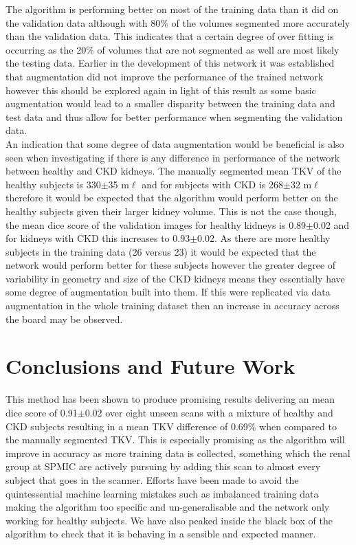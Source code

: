 The algorithm is performing better on most of the training data than it did on the validation data although with 80\% of the volumes segmented more accurately than the validation data. This indicates that a certain degree of over fitting is occurring as the 20\% of volumes that are not segmented as well are most likely the testing data. Earlier in the development of this network it was established that augmentation did not improve the performance of the trained network however this should be explored again in light of this result as some basic augmentation would lead to a smaller disparity between the training data and test data and thus allow for better performance when segmenting the validation data.\\

An indication that some degree of data augmentation would be beneficial is also seen when investigating if there is any difference in performance of the network between healthy and \ac{CKD} kidneys. The manually segmented mean \ac{TKV} of the healthy subjects is 330$\pm$35 m$\ell$ and for subjects with \ac{CKD} is 268$\pm$32 m$\ell$ therefore it would be expected that the algorithm would perform better on the healthy subjects given their larger kidney volume. This is not the case though, the mean dice score of the validation images for healthy kidneys is 0.89$\pm$0.02 and for kidneys with \ac{CKD} this increases to 0.93$\pm$0.02. As there are more healthy subjects in the training data (26 versus 23) it would be expected that the network would perform better for these subjects however the greater degree of variability in geometry and size of the \ac{CKD} kidneys means they essentially have some degree of augmentation built into them. If this were replicated via data augmentation in the whole training dataset then an increase in accuracy across the board may be observed.\\

\newpage
\section{Conclusions and Future Work}

This method has been shown to produce promising results delivering an mean dice score of 0.91$\pm$0.02 over eight unseen scans with a mixture of healthy and \ac{CKD} subjects resulting in a mean \ac{TKV} difference of 0.69\% when compared to the manually segmented \ac{TKV}. This is especially promising as the algorithm will improve in accuracy as more training data is collected, something which the renal group at \ac{SPMIC} are actively pursuing by adding this scan to almost every subject that goes in the scanner. Efforts have been made to avoid the quintessential machine learning mistakes such as imbalanced training data making the algorithm too specific and un-generalisable and the network only working for healthy subjects. We have also peaked inside the black box of the algorithm to check that it is behaving in a sensible and expected manner.\\

